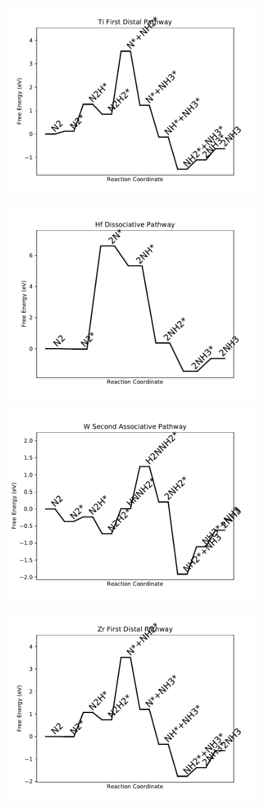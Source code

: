 \documentclass[journal=jacsat,manuscript=article]{achemso}
\begin{document}
\begin{figure}
\includegraphics[width=0.5\linewidth]{data/plots/Ti_distal_1.pdf}
\label{fig:Ti_distal_1}
\end{figure}

\newpage
\begin{figure}
\includegraphics[width=0.5\linewidth]{data/plots/Hf_dissociative.pdf}
\label{fig:Hf_dissociative}
\end{figure}

\begin{figure}
\includegraphics[width=0.5\linewidth]{data/plots/W_associative_2.pdf}
\label{fig:W_associative_2}
\end{figure}

\newpage
\begin{figure}
\includegraphics[width=0.5\linewidth]{data/plots/Zr_distal_1.pdf}
\label{fig:Zr_distal_1}
\end{figure}
\end{document}
